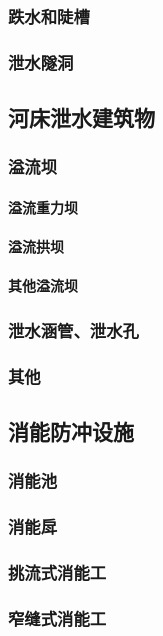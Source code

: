 \documentclass[UTF8]{../../ApplicationUniverse}
\begin{document}
        \subsubsection{跌水和陡槽}
        \subsubsection{泄水隧洞}
    \subsection{河床泄水建筑物}
        \subsubsection{溢流坝}
            \paragraph{溢流重力坝}
            \paragraph{溢流拱坝}
            \paragraph{其他溢流坝}
        \subsubsection{泄水涵管、泄水孔}
        \subsubsection{其他}
    \subsection{消能防冲设施}
        \subsubsection{消能池}
        \subsubsection{消能戽}
        \subsubsection{挑流式消能工}
        \subsubsection{窄缝式消能工}
\end{document}
